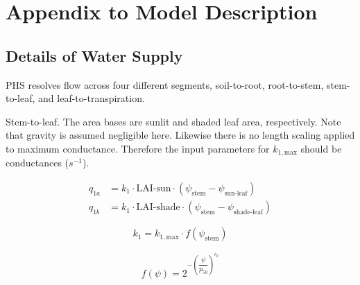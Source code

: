 \documentclass[draft,linenumbers]{agujournal}
\begin{document}
  


\clearpage

\appendix
\section{Appendix to Model Description}

\subsection{Details of Water Supply}

PHS resolves flow across four different segments, soil-to-root, root-to-stem, stem-to-leaf, and leaf-to-transpiration.

Stem-to-leaf. The area bases are sunlit and shaded leaf area, respectively. 
Note that gravity is assumed negligible here. 
Likewise there is no length scaling applied to maximum conductance. 
Therefore the input parameters for $k_{1,\text{max}}$ should be conductances ($s^{-1}$).

\begin{linenomath*} \begin{equation} \begin{aligned}
q_{1a} &= k_{1} \cdot \text{LAI-sun}  \cdot \left( \psi_{\text{stem}}-\psi_{\text{sun-leaf}}\right) \\
q_{1b} &= k_{1} \cdot \text{LAI-shade} \cdot  \left( \psi_{\text{stem}}-\psi_{\text{shade-leaf}}\right)
\end{aligned} \end{equation} \end{linenomath*}

\begin{linenomath*} \begin{equation}
k_{1} = k_{1,\text{max}} \cdot f\left(\psi_{\text{stem}}\right)
\end{equation} \end{linenomath*}

\begin{linenomath*} \begin{equation} \begin{aligned}
f\left(\psi\right)=2^{-\left(\dfrac{\psi}{p_{50}}\right)^{c_k}}
\end{aligned} \end{equation} \end{linenomath*}
\end{document}
